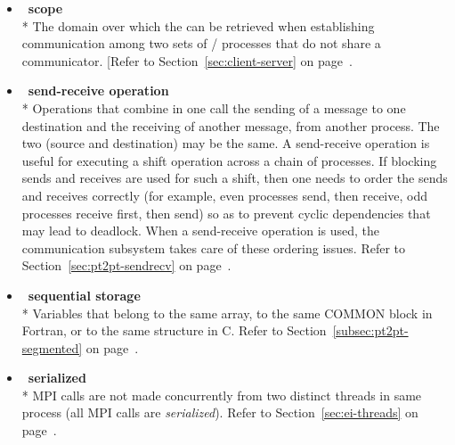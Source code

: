 \begin{itemize}
\label{glossary:scope}
\item  ~\hypertarget{glossary:scope}{\textbf{scope}} \\*
The domain over which the  
can be retrieved when establishing communication among
two sets of \MPI/ processes that do not share a communicator.
[Refer to Section~\ref{sec:client-server} on page~\pageref{sec:client-server}.

\label{glossary:send-receive_operation}
\item  ~\hypertarget{glossary:send-receive_operation}{\textbf{send-receive operation}} \\*
Operations that combine in one call the sending of a
message to one destination and the receiving of another message, from
another process.  The two (source and destination) may be the same.
A send-receive operation is
useful for executing a shift operation across a chain of
processes.  If blocking sends and receives are used for such a shift,
then one needs to order the sends and receives correctly (for
example, even processes
send, then receive, odd processes receive first, then send) so as to prevent
cyclic dependencies that may lead to deadlock.  When a send-receive
operation is used, the communication subsystem takes care of
these ordering issues.
Refer to Section~\ref{sec:pt2pt-sendrecv} on page~\pageref{sec:pt2pt-sendrecv}.

\label{glossary:sequential_storage}
\item  ~\hypertarget{glossary:sequential_storage}{\textbf{sequential storage}} \\*
Variables that belong to the same array,
to the same {\sf COMMON} block in Fortran, or to the same structure in C.
Refer to Section~\ref{subsec:pt2pt-segmented} on page~\pageref{subsec:pt2pt-segmented}.

\label{glossary:serialized}
\item  ~\hypertarget{glossary:serialized}{\textbf{serialized}} \\*
MPI calls are not made concurrently from two distinct threads in same process (all MPI calls are \emph{serialized}).
Refer to Section~\ref{sec:ei-threads} on page~\pageref{sec:ei-threads}.


\end{itemize}
